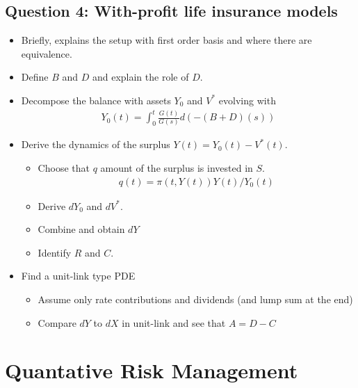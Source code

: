 \documentclass[
]{book}
\providecommand{\tightlist}{%
  \setlength{\itemsep}{0pt}\setlength{\parskip}{0pt}}
\begin{document}
\newpage

\hypertarget{question-4-with-profit-life-insurance-models}{%
\section{Question 4: With-profit life insurance models}\label{question-4-with-profit-life-insurance-models}}

\begin{itemize}
\tightlist
\item
  Briefly, explains the setup with first order basis and where there are equivalence.
\item
  Define \(B\) and \(D\) and explain the role of \(D\).
\item
  Decompose the balance with assets \(Y_0\) and \(V^*\) evolving with
  \begin{align*}
    Y_0(t)=\int_0^t\frac{G(t)}{G(s)}d(-(B+D)(s))
    \end{align*}
\item
  Derive the dynamics of the surplus \(Y(t)=Y_0(t)-V^*(t)\).

  \begin{itemize}
  \tightlist
  \item
    Choose that \(q\) amount of the surplus is invested in \(S\).
    \begin{align*}
    q(t)=\pi(t,Y(t))Y(t)/Y_0(t)
    \end{align*}
  \item
    Derive \(dY_0\) and \(dV^*\).
  \item
    Combine and obtain \(dY\)
  \item
    Identify \(R\) and \(C\).
  \end{itemize}
\item
  Find a unit-link type PDE

  \begin{itemize}
  \tightlist
  \item
    Assume only rate contributions and dividends (and lump sum at the end)
  \item
    Compare \(dY\) to \(dX\) in unit-link and see that \(A=D-C\)
  \end{itemize}
\end{itemize}

\hypertarget{quantative-risk-management}{%
\chapter{Quantative Risk Management}\label{quantative-risk-management}}
\end{document}
